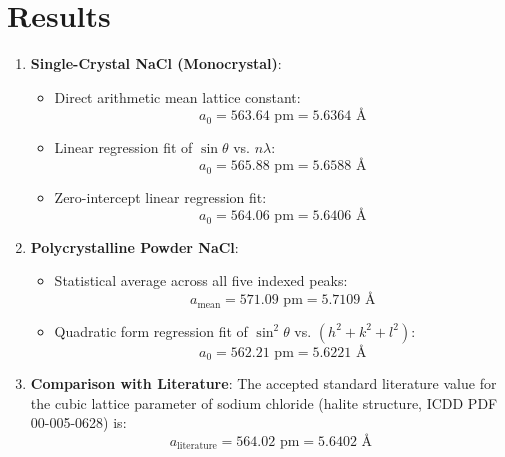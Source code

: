 \documentclass[12pt,a4paper]{article}
\begin{document}
\section{Results}
\begin{enumerate}
    \item \textbf{Single-Crystal NaCl (Monocrystal)}:
    \begin{itemize}
        \item Direct arithmetic mean lattice constant:
        \begin{equation}
            a_0 = 563.64\text{ pm} = 5.6364\text{ \AA}
        \end{equation}
        \item Linear regression fit of $\sin\theta$ vs. $n\lambda$:
        \begin{equation}
            a_0 = 565.88\text{ pm} = 5.6588\text{ \AA}
        \end{equation}
        \item Zero-intercept linear regression fit:
        \begin{equation}
            a_0 = 564.06\text{ pm} = 5.6406\text{ \AA}
        \end{equation}
    \end{itemize}

    \item \textbf{Polycrystalline Powder NaCl}:
    \begin{itemize}
        \item Statistical average across all five indexed peaks:
        \begin{equation}
            a_{\text{mean}} = 571.09\text{ pm} = 5.7109\text{ \AA}
        \end{equation}
        \item Quadratic form regression fit of $\sin^2\theta$ vs. $(h^2 + k^2 + l^2)$:
        \begin{equation}
            a_0 = 562.21\text{ pm} = 5.6221\text{ \AA}
        \end{equation}
    \end{itemize}

    \item \textbf{Comparison with Literature}:
    The accepted standard literature value for the cubic lattice parameter of sodium chloride (halite structure, ICDD PDF 00-005-0628) is:
    \begin{equation}
        a_{\text{literature}} = 564.02\text{ pm} = 5.6402\text{ \AA}
    \end{equation}
\end{enumerate}
\end{document}
